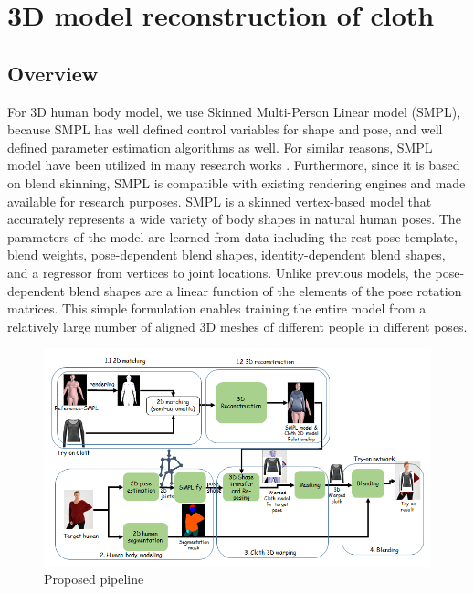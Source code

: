 \section{3D model reconstruction of cloth} \label{section:3dclothrecon}

\subsection{Overview} 

For 3D human body model, we use Skinned Multi-Person Linear model (SMPL)\cite{Loper2015SMPLAS}, because SMPL has well defined control variables for shape and pose, and well defined parameter estimation algorithms as well. For similar reasons, SMPL\cite{Loper2015SMPLAS} model have been utilized in many research works \cite{Zanfir2018HumanAT,Weng2018PhotoW3}. Furthermore, since it is based on blend skinning, SMPL is compatible with existing rendering engines\cite{Loper2015SMPLAS} and made available for research purposes. SMPL is a skinned vertex-based model that accurately represents a wide variety of body shapes in natural human poses. The parameters of the model are learned from data including the rest pose template, blend weights, pose-dependent blend shapes, identity-dependent blend shapes, and a regressor from vertices to joint locations. Unlike previous models, the pose-dependent blend shapes are a linear function of the elements of the pose rotation matrices. This simple formulation enables training the entire model from a relatively large number of aligned 3D meshes of different people in different poses. \cite{Loper2015SMPLAS} 


\begin{figure}[t]
\centering
\includegraphics[scale=0.6]{figures/updatedpipeline.png}
\caption{Proposed pipeline}
\label{fig:pipeline}
\end{figure}


